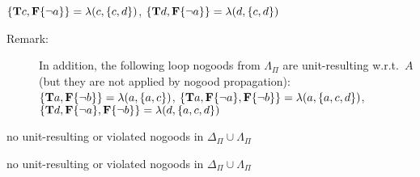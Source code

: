 \begin{Loesung}
{\begin{UList}
      $\{\mathbf{T}c,\mathbf{F}\{{\neg{a}}\}\}=                     \lambda(c,\{c,d\})$,\newline
      $\{\mathbf{T}d,\mathbf{F}\{{\neg{a}}\}\}=                     \lambda(d,\{c,d\})$
      \begin{description}
      \item[Remark:]
      In addition, the following loop nogoods from $\Lambda_\Pi$ are unit-resulting w.r.t.~$A$
      (but they are not applied by nogood propagation):\newline
      $\{\mathbf{T}a,\mathbf{F}\{{\neg{b}}\}\}=\lambda(a,\{a,c\})$,\newline
      $\{\mathbf{T}a,\mathbf{F}\{{\neg{a}}\},\mathbf{F}\{{\neg{b}}\}\}=                       \lambda(a,\{a,c,d\})$,\newline
      $\{\mathbf{T}d,\mathbf{F}\{{\neg{a}}\},\mathbf{F}\{{\neg{b}}\}\}=                       \lambda(d,\{a,c,d\})$
      \end{description}
\item no unit-resulting or violated nogoods in $\Delta_\Pi\cup\Lambda_\Pi$
\item no unit-resulting or violated nogoods in $\Delta_\Pi\cup\Lambda_\Pi$
\end{UList}}
\newpage
\end{Loesung}

